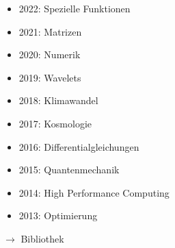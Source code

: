 \begin{frame}[t]
\begin{columns}[t,onlytextwidth]
\begin{column}{0.52\textwidth}
\begin{itemize}
\item 2022: Spezielle Funktionen
\item 2021: Matrizen
\item 2020: Numerik
\item 2019: Wavelets
\item 2018: Klimawandel
\item 2017: Kosmologie
\item 2016: Differentialgleichungen
\item 2015: Quantenmechanik
\item 2014: High Performance Computing
\item 2013: Optimierung
\end{itemize}
{$\rightarrow$ Bibliothek}
\end{column}
\end{columns}
\end{frame}
\egroup
